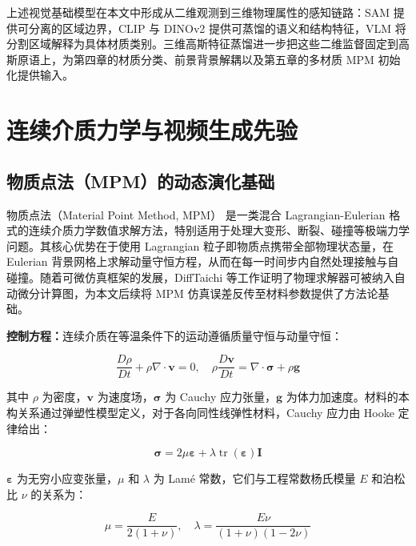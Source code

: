 上述视觉基础模型在本文中形成从二维观测到三维物理属性的感知链路：SAM 提供可分离的区域边界，CLIP 与 DINOv2 提供可蒸馏的语义和结构特征，VLM 将分割区域解释为具体材质类别。三维高斯特征蒸馏进一步把这些二维监督固定到高斯原语上，为第四章的材质分类、前景背景解耦以及第五章的多材质 MPM 初始化提供输入。

\section{连续介质力学与视频生成先验}

\subsection{物质点法（MPM）的动态演化基础}

物质点法（Material Point Method, MPM）\cite{mpm} 是一类混合 Lagrangian-Eulerian 格式的连续介质力学数值求解方法，特别适用于处理大变形、断裂、碰撞等极端力学问题。其核心优势在于使用 Lagrangian 粒子即物质点携带全部物理状态量，在 Eulerian 背景网格上求解动量守恒方程，从而在每一时间步内自然处理接触与自碰撞。随着可微仿真框架的发展，DiffTaichi\cite{difftaichi} 等工作证明了物理求解器可被纳入自动微分计算图，为本文后续将 MPM 仿真误差反传至材料参数提供了方法论基础。

\textbf{控制方程：}连续介质在等温条件下的运动遵循质量守恒与动量守恒：

\begin{equation}
\frac{D\rho}{Dt} + \rho \nabla \cdot \mathbf{v} = 0, \quad \rho \frac{D\mathbf{v}}{Dt} = \nabla \cdot \boldsymbol{\sigma} + \rho \mathbf{g}
\end{equation}

其中 $\rho$ 为密度，$\mathbf{v}$ 为速度场，$\boldsymbol{\sigma}$ 为 Cauchy 应力张量，$\mathbf{g}$ 为体力加速度。材料的本构关系通过弹塑性模型定义，对于各向同性线弹性材料，Cauchy 应力由 Hooke 定律给出：

\begin{equation}
\boldsymbol{\sigma} = 2\mu \boldsymbol{\varepsilon} + \lambda \operatorname{tr}(\boldsymbol{\varepsilon}) \mathbf{I}
\end{equation}

$\boldsymbol{\varepsilon}$ 为无穷小应变张量，$\mu$ 和 $\lambda$ 为 Lam\'{e} 常数，它们与工程常数杨氏模量 $E$ 和泊松比 $\nu$ 的关系为：

\begin{equation}
\mu = \frac{E}{2(1 + \nu)}, \quad \lambda = \frac{E\nu}{(1 + \nu)(1 - 2\nu)}
\end{equation}

